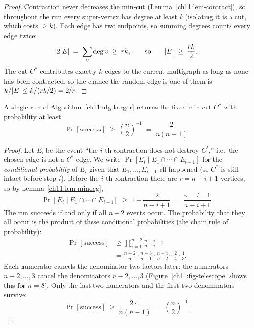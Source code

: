 \begin{proof}
Contraction never decreases the min-cut (Lemma~\ref{ch11:lem-contract}), so throughout the run every super-vertex has degree at least $k$ (isolating it is a cut, which costs $\ge k$). Each edge has two endpoints, so summing degrees counts every edge twice:
\[
  2\lvert E\rvert \;=\; \sum_v \deg v \;\ge\; rk, \qquad\text{so}\qquad \lvert E\rvert \;\ge\; \frac{rk}{2}.
\] The cut $C^\ast$ contributes exactly $k$ edges to the current multigraph as long as none has been contracted, so the chance the random edge is one of them is $k/\lvert E\rvert \le k/(rk/2)=2/r$.
\end{proof}

\begin{theorem}\label{ch11:thm-karger}
A single run of Algorithm~\ref{ch11:alg-karger} returns the fixed min-cut $C^\ast$ with probability at least
\[
  \Pr[\text{success}] \;\ge\; \binom{n}{2}^{-1} \;=\; \frac{2}{n(n-1)}.
\]
\end{theorem}

\begin{proof}
Let $E_i$ be the event ``the $i$-th contraction does not destroy $C^\ast$,'' i.e.\ the chosen edge is not a $C^\ast$-edge. We write $\Pr[E_i \mid E_1\cap\cdots\cap E_{i-1}]$ for the \emph{conditional probability} of $E_i$ given that $E_1,\dots,E_{i-1}$ all happened (so $C^\ast$ is still intact before step $i$). Before the $i$-th contraction there are $r=n-i+1$ vertices, so by Lemma~\ref{ch11:lem-mindeg},
\[
  \Pr[E_i \mid E_1\cap\cdots\cap E_{i-1}] \;\ge\; 1-\frac{2}{n-i+1}\;=\;\frac{n-i-1}{n-i+1}.
\]
The run succeeds if and only if all $n-2$ events occur. The probability that they all occur is the product of these conditional probabilities (the chain rule of probability):
\begin{align*}
  \Pr[\text{success}] &\ge \prod_{i=1}^{n-2}\frac{n-i-1}{n-i+1}\\
                      &= \frac{n-2}{n}\cdot\frac{n-3}{n-1}\cdot\frac{n-4}{n-2}\cdots\frac{2}{4}\cdot\frac{1}{3}.
\end{align*}
Each numerator cancels the denominator two factors later: the numerators $n-2,\dots,3$ cancel the denominators $n-2,\dots,3$ (Figure~\ref{ch11:fig-telescope} shows this for $n=8$). Only the last two numerators and the first two denominators survive:
\[
  \Pr[\text{success}] \;\ge\; \frac{2\cdot 1}{n(n-1)} \;=\; \binom{n}{2}^{-1}.
\]
\end{proof}

